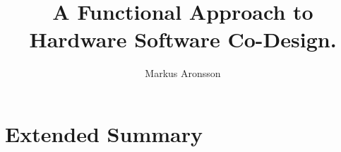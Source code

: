 \documentclass[licentiate,g5paper,gu]{chalmers-thesis}
\title{A Functional Approach to Hardware Software Co-Design.}
\author{Markus Aronsson} %
\begin{document}
\maketitle

\part{Extended Summary} %
\cleardoublepage





\end{document}
